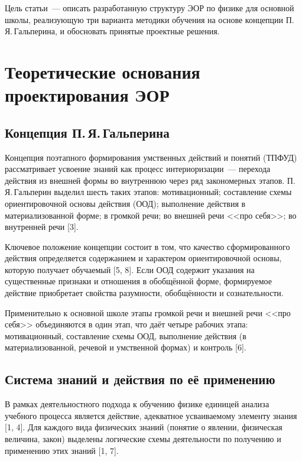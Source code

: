 \documentclass[14pt]{extarticle}
\begin{document}
Цель статьи~--- описать разработанную структуру ЭОР по физике для основной
школы, реализующую три варианта методики обучения на основе концепции
П.\,Я.\,Гальперина, и обосновать принятые проектные решения.



\section{Теоретические основания проектирования ЭОР}

\subsection{Концепция П.\,Я.\,Гальперина}

Концепция поэтапного формирования умственных действий и понятий (ТПФУД)
рассматривает усвоение знаний как процесс интериоризации~--- перехода действия
из внешней формы во внутреннюю через ряд закономерных этапов.
П.\,Я.\,Гальперин выделил шесть таких этапов: мотивационный; составление
схемы ориентировочной основы действия (ООД); выполнение действия
в материализованной форме; в громкой речи; во внешней речи <<про себя>>;
во внутренней речи [3].

Ключевое положение концепции состоит в том, что качество сформированного действия
определяется содержанием и характером ориентировочной основы, которую получает
обучаемый [5, 8]. Если ООД содержит указания на существенные признаки и отношения
в обобщённой форме, формируемое действие приобретает свойства разумности,
обобщённости и сознательности.

Применительно к основной школе этапы громкой речи и внешней речи <<про себя>>
объединяются в один этап, что даёт четыре рабочих этапа:
мотивационный, составление схемы ООД, выполнение действия (в материализованной,
речевой и умственной формах) и контроль [6].


\subsection{Система знаний и действия по её применению}

В рамках деятельностного подхода к обучению физике единицей анализа учебного
процесса является действие, адекватное усваиваемому элементу знания [1, 4].
Для каждого вида физических знаний (понятие о явлении, физическая величина,
закон) выделены логические схемы деятельности по получению и применению
этих знаний [1, 7].
\end{document}
